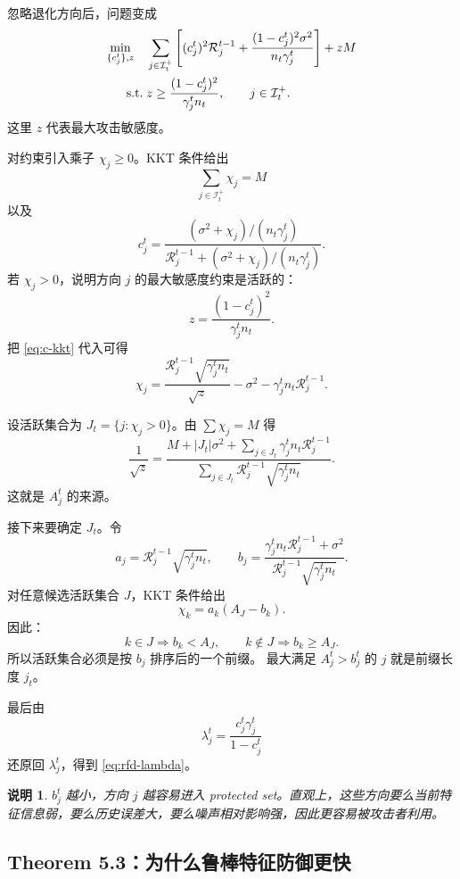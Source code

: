 \documentclass[UTF8,fontset=none,11pt]{ctexart}
\theoremstyle{cnstyle}
\newtheorem{remark}[theorem]{说明}
\newcommand{\calR}{\mathcal{R}}
\newcommand{\calI}{\mathcal{I}}
\newcommand{\st}{\;\mathrm{s.t.}\;}
\begin{document}
忽略退化方向后，问题变成
\begin{align}
  \min_{\{c_j^t\},z}\quad
  &
  \sum_{j\in\calI_t^+}
  \left[
  (c_j^t)^2\calR_j^{t-1}
  +
  \frac{(1-c_j^t)^2\sigma^2}{n_t\gamma_j^t}
  \right]
  +zM
  \notag\\
  \st&
  z\ge
  \frac{(1-c_j^t)^2}{\gamma_j^tn_t},
  \qquad j\in\calI_t^+ .
  \label{eq:kkt-problem}
\end{align}
这里 \(z\) 代表最大攻击敏感度。

对约束引入乘子 \(\chi_j\ge0\)。KKT 条件给出
\[
  \sum_{j\in\calI_t^+}\chi_j=M
\]
以及
\begin{equation}
  c_j^t=
  \frac{(\sigma^2+\chi_j)/(n_t\gamma_j^t)}
  {\calR_j^{t-1}+(\sigma^2+\chi_j)/(n_t\gamma_j^t)} .
  \label{eq:c-kkt}
\end{equation}
若 \(\chi_j>0\)，说明方向 \(j\) 的最大敏感度约束是活跃的：
\[
  z=\frac{(1-c_j^t)^2}{\gamma_j^tn_t}.
\]
把 \eqref{eq:c-kkt} 代入可得
\begin{equation}
  \chi_j
  =
  \frac{\calR_j^{t-1}\sqrt{\gamma_j^tn_t}}{\sqrt z}
  -\sigma^2
  -\gamma_j^tn_t\calR_j^{t-1}.
  \label{eq:chi}
\end{equation}

设活跃集合为 \(J_t=\{j:\chi_j>0\}\)。由 \(\sum\chi_j=M\) 得
\[
  \frac{1}{\sqrt z}
  =
  \frac{
  M+|J_t|\sigma^2+\sum_{j\in J_t}\gamma_j^tn_t\calR_j^{t-1}
  }{
  \sum_{j\in J_t}\calR_j^{t-1}\sqrt{\gamma_j^tn_t}
  } .
\]
这就是 \(A_j^t\) 的来源。

接下来要确定 \(J_t\)。令
\[
  a_j=\calR_j^{t-1}\sqrt{\gamma_j^tn_t},
  \qquad
  b_j=
  \frac{\gamma_j^tn_t\calR_j^{t-1}+\sigma^2}
  {\calR_j^{t-1}\sqrt{\gamma_j^tn_t}} .
\]
对任意候选活跃集合 \(J\)，KKT 条件给出
\[
  \chi_k=a_k(A_J-b_k).
\]
因此：
\[
  k\in J \Rightarrow b_k<A_J,
  \qquad
  k\notin J \Rightarrow b_k\ge A_J .
\]
所以活跃集合必须是按 \(b_j\) 排序后的一个前缀。
最大满足 \(A_j^t>b_j^t\) 的 \(j\) 就是前缀长度 \(j_t\)。

最后由
\[
  \lambda_j^t=\frac{c_j^t\gamma_j^t}{1-c_j^t}
\]
还原回 \(\lambda_j^t\)，得到 \eqref{eq:rfd-lambda}。

\begin{remark}
\(b_j^t\) 越小，方向 \(j\) 越容易进入 protected set。直观上，这些方向要么当前特征信息弱，要么历史误差大，要么噪声相对影响强，因此更容易被攻击者利用。
\end{remark}

\subsection{Theorem 5.3：为什么鲁棒特征防御更快}
\end{document}
